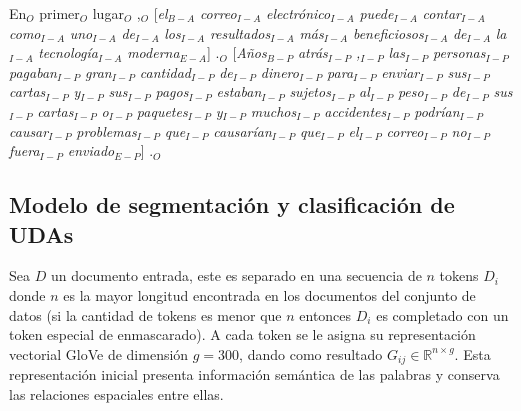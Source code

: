\documentclass[a4paper,11pt,twocolumn,twoside]{article}
\begin{document}
\begin{adjustwidth}{25pt}{25pt}
	En$_O$ primer$_O$ lugar$_O$ ,$_O$
	[\textit{el$_{B-A}$}
	\textit{correo$_{I-A}$}
	\textit{electrónico$_{I-A}$}
	\textit{puede$_{I-A}$}
	\textit{contar$_{I-A}$}
	\textit{como$_{I-A}$}
	\textit{uno$_{I-A}$}
	\textit{de$_{I-A}$}
	\textit{los$_{I-A}$}
	\textit{resultados$_{I-A}$}
	\textit{más$_{I-A}$}
	\textit{beneficiosos$_{I-A}$}
	\textit{de$_{I-A}$}
	\textit{la$_{I-A}$}
	\textit{tecnología$_{I-A}$}
	\textit{moderna$_{E-A}$}]
	.$_{O}$
	[\textit{Años$_{B-P}$}
	\textit{atrás$_{I-P}$}
	\textit{,$_{I-P}$}
	\textit{las$_{I-P}$}
	\textit{personas$_{I-P}$}
	\textit{pagaban$_{I-P}$}
	\textit{gran$_{I-P}$}
	\textit{cantidad$_{I-P}$}
	\textit{de$_{I-P}$}
	\textit{dinero$_{I-P}$}
	\textit{para$_{I-P}$}
	\textit{enviar$_{I-P}$}
	\textit{sus$_{I-P}$}
	\textit{cartas$_{I-P}$}
	\textit{y$_{I-P}$}
	\textit{sus$_{I-P}$}
	\textit{pagos$_{I-P}$}
	\textit{estaban$_{I-P}$}
	\textit{sujetos$_{I-P}$}
	\textit{al$_{I-P}$}
	\textit{peso$_{I-P}$}
	\textit{de$_{I-P}$}
	\textit{sus$_{I-P}$}
	\textit{cartas$_{I-P}$}
	\textit{o$_{I-P}$}
	\textit{paquetes$_{I-P}$}
	\textit{y$_{I-P}$}
	\textit{muchos$_{I-P}$}
	\textit{accidentes$_{I-P}$}
	\textit{podrían$_{I-P}$}
	\textit{causar$_{I-P}$}
	\textit{problemas$_{I-P}$}
	\textit{que$_{I-P}$}
	\textit{causarían$_{I-P}$}
	\textit{que$_{I-P}$}
	\textit{el$_{I-P}$}
	\textit{correo$_{I-P}$}
	\textit{no$_{I-P}$}
	\textit{fuera$_{I-P}$}
	\textit{enviado$_{E-P}$}]
	.$_{O}$
\end{adjustwidth}

\subsection{Modelo de segmentación y clasificación de UDAs}

Sea $D$ un documento entrada, este es separado en una secuencia de $n$ tokens $D_i$ donde $n$ es la mayor longitud encontrada
en los documentos del conjunto de datos (si la cantidad de tokens es menor que $n$ entonces $D_i$ es completado con un token especial de enmascarado). 
A cada token se le asigna
su representación vectorial GloVe de dimensión $g=300$, dando como resultado $G_{ij} \in \mathbb{R}^{n \times g}$.
Esta representación inicial presenta información semántica de las palabras y conserva las relaciones 
espaciales entre ellas. 
\end{document}
